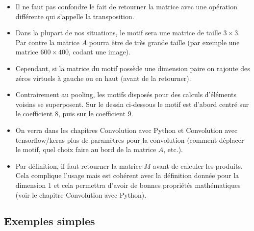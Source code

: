\documentclass[11pt,class=report,crop=false]{standalone}
\begin{document}
  
\begin{remarque*}
\sauteligne
\begin{itemize}

  \item Il ne faut pas confondre le fait de retourner la matrice avec une opération différente qui s'appelle la transposition.
  
  \item Dans la plupart de nos situations, le motif sera une matrice de taille $3 \times 3$. Par contre la matrice $A$ pourra être de très grande taille (par exemple une matrice $600 \times 400$, codant une image).
  
  \item Cependant, si la matrice du motif possède une dimension paire on rajoute des zéros virtuels à gauche ou en haut (avant de la retourner).

   
\item Contrairement au pooling, les motifs disposés pour des calculs d'éléments voisins se superposent.
  Sur le dessin ci-dessous le motif est d'abord centré sur le coefficient $8$, puis sur le coefficient $9$.
  
  
  \item On verra dans les chapitres \og{}Convolution avec Python\fg{} et \og{}Convolution avec tensorflow/keras\fg{}
  plus de paramètres pour la convolution (comment déplacer le motif, quel choix faire au bord de la matrice $A$, etc.).
  
  \item Par définition, il faut retourner la matrice $M$ avant de calculer les produits. Cela complique l'usage mais est cohérent avec la définition donnée pour la dimension $1$ et cela permettra d'avoir de bonnes propriétés mathématiques (voir le chapitre \og{}Convolution avec Python\fg{}).
\end{itemize}
\end{remarque*} 

\subsection{Exemples simples}
\end{document}
